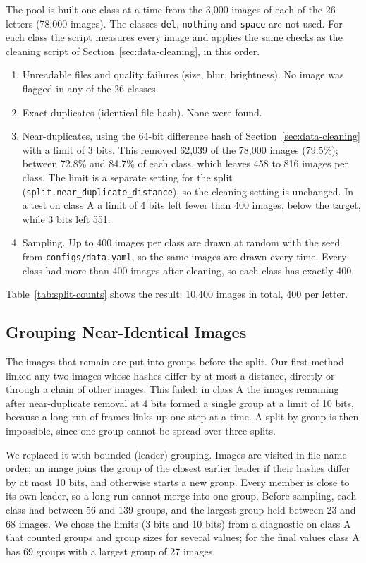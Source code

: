 The pool is built one class at a time from the 3{,}000 images of each of the 26 letters (78{,}000 images). The classes \texttt{del}, \texttt{nothing} and \texttt{space} are not used. For each class the script measures every image and applies the same checks as the cleaning script of Section~\ref{sec:data-cleaning}, in this order.
\begin{enumerate}
  \item Unreadable files and quality failures (size, blur, brightness). No image was flagged in any of the 26 classes.
  \item Exact duplicates (identical file hash). None were found.
  \item Near-duplicates, using the 64-bit difference hash of Section~\ref{sec:data-cleaning} with a limit of 3 bits. This removed 62{,}039 of the 78{,}000 images (79.5\%); between 72.8\% and 84.7\% of each class, which leaves 458 to 816 images per class. The limit is a separate setting for the split (\texttt{split.near\_duplicate\_distance}), so the cleaning setting is unchanged. In a test on class A a limit of 4 bits left fewer than 400 images, below the target, while 3 bits left 551.
  \item Sampling. Up to 400 images per class are drawn at random with the seed from \texttt{configs/data.yaml}, so the same images are drawn every time. Every class had more than 400 images after cleaning, so each class has exactly 400.
\end{enumerate}
Table~\ref{tab:split-counts} shows the result: 10{,}400 images in total, 400 per letter.

\subsection{Grouping Near-Identical Images}

The images that remain are put into groups before the split. Our first method linked any two images whose hashes differ by at most a distance, directly or through a chain of other images. This failed: in class A the images remaining after near-duplicate removal at 4 bits formed a single group at a limit of 10 bits, because a long run of frames links up one step at a time. A split by group is then impossible, since one group cannot be spread over three splits.

We replaced it with bounded (leader) grouping. Images are visited in file-name order; an image joins the group of the closest earlier leader if their hashes differ by at most 10 bits, and otherwise starts a new group. Every member is close to its own leader, so a long run cannot merge into one group. Before sampling, each class had between 56 and 139 groups, and the largest group held between 23 and 68 images. We chose the limits (3 bits and 10 bits) from a diagnostic on class A that counted groups and group sizes for several values; for the final values class A has 69 groups with a largest group of 27 images.


